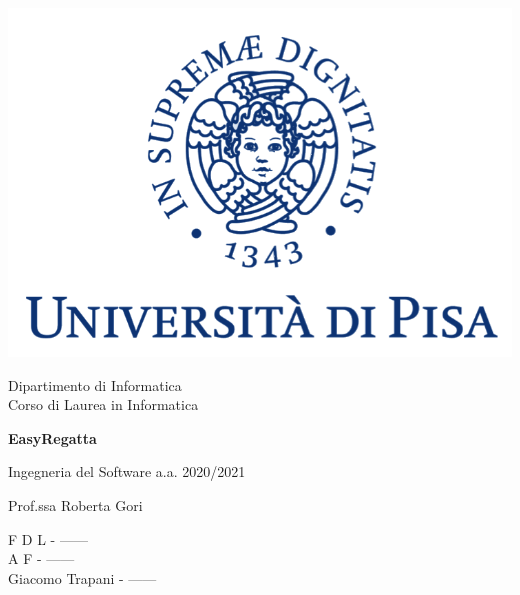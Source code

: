 \documentclass[10pt, openany, landscape]{book}
\begin{document}
\begin{titlepage}
	\clearpage\thispagestyle{empty}
	\centering
	\vspace{1cm}

    \includegraphics[scale=0.60]{unipi-logo.png}
    
	{\normalsize \noindent Dipartimento di Informatica \\
	             Corso di Laurea in Informatica \par}
	
	\vspace{2cm}
	{\Huge \textbf{EasyRegatta} \par}
	\vspace{1cm}
	{\large Ingegneria del Software a.a. 2020/2021}

    \begin{minipage}[t]{0.47\textwidth}
    	{\large{ Prof.ssa Roberta Gori}}
    \end{minipage}\hfill\begin{minipage}[t]{0.47\textwidth}\raggedleft
        {\large {F D L - ------ \\ }}
        {\large {A F - ------ \\ }}
    	{\large {Giacomo Trapani - ------ \\ }}
    \end{minipage}

    \vspace{4cm}

	\pagebreak

\end{titlepage}

\end{document}
